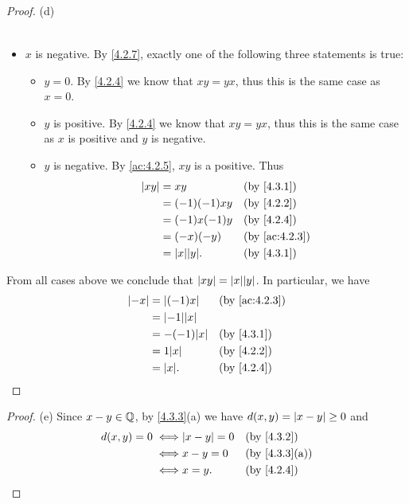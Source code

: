 \begin{proof}{(d)}
\begin{itemize}
\begin{itemize}
\begin{align*}
                  \end{align*}
          \end{itemize}
    \item \(x\) is negative.
          By \cref{4.2.7}, exactly one of the following three statements is true:
          \begin{itemize}
            \item \(y = 0\).
                  By \cref{4.2.4} we know that \(xy = yx\), thus this is the same case as \(x = 0\).
            \item \(y\) is positive.
                  By \cref{4.2.4} we know that \(xy = yx\), thus this is the same case as \(x\) is positive and \(y\) is negative.
            \item \(y\) is negative.
                  By \cref{ac:4.2.5}, \(xy\) is a positive.
                  Thus
                  \begin{align*}
                    \abs{xy} & = xy               &  & \by{4.3.1}                  \\
                             & = (-1)(-1)xy       &  & \by{4.2.2}                  \\
                             & = (-1)x(-1)y       &  & \by{4.2.4}                  \\
                             & = (-x)(-y)         &  & \text{(by \cref{ac:4.2.3})} \\
                             & = \abs{x} \abs{y}. &  & \by{4.3.1}
                  \end{align*}
          \end{itemize}
  \end{itemize}
  From all cases above we conclude that \(\abs{xy} = \abs{x} \abs{y}\).
  In particular, we have
  \begin{align*}
    \abs{-x} & = \abs{(-1)x}      &  & \text{(by \cref{ac:4.2.3})} \\
             & = \abs{-1} \abs{x}                                  \\
             & = -(-1) \abs{x}    &  & \by{4.3.1}                  \\
             & = 1 \abs{x}        &  & \by{4.2.2}                  \\
             & = \abs{x}.         &  & \by{4.2.4}
  \end{align*}
\end{proof}

\begin{proof}{(e)}
  Since \(x - y \in \mathbb{Q}\), by \cref{4.3.3}(a) we have \(d(x, y) = \left\lvert x - y\right\rvert \geq 0\) and
  \begin{align*}
    d(x, y) = 0
    \iff & \abs{x - y} = 0 &  & \by{4.3.2}                  \\
    \iff & x - y = 0       &  & \text{(by \cref{4.3.3}(a))} \\
    \iff & x = y.          &  & \by{4.2.4}
  \end{align*}
\end{proof}

